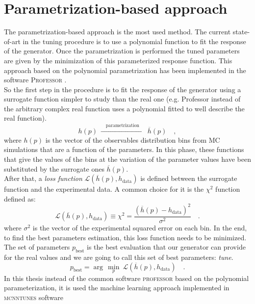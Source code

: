 \section{Parametrization-based approach}

The parametrization-based approach is the most used method. The current state-of-art in the tuning procedure is to use a polynomial function to fit the response of the generator. Once the parametrization is performed the tuned parameters are given by the minimization of this parameterized response function. This approach based on the polynomial parametrization has been  implemented in the software \textsc{Professor} \cite{Buckley:2009bj}. 
\\
So the first step in the procedure is to fit the response of the generator using a surrogate function simpler to study than the real one (e.g. Professor instead of the arbitrary complex real function uses a polynomial fitted to well describe the real function).
\begin{equation}
	h(p)\ \xrightarrow{\quad \text{parametrization}\quad }\ \overline{h}(p)\quad ,
\end{equation}
where $h(p)$ is the vector of the observables distribution bins from MC simulations that are a function of the parameters. In this phase, these functions that give the values of the bins at the variation of the parameter values have been substituted by the surrogate ones $\overline{h}(p)$.  
\\
After that, a \textit{loss function} $\mathcal{L}(\overline{h}(p),h_{\text{data}})$ is defined between the surrogate function and the experimental data. A common choice for it is the $\chi^2$ function defined as:
\begin{equation}
	\mathcal{L}(\overline{h}(p),h_{\text{data}})\equiv \chi^2=\frac{(\overline{h}(p)-h_{\text{data}})^2}{\sigma^2}\quad.
\end{equation}
where $\sigma^2$ is the vector of the experimental squared error on each bin.  
In the end, to find the best parameters estimation, this loss function needs to be minimized. The set of parameters $p_{\text{best}}$ is the best evaluation that our generator can provide for the real values and we are going to call this set of best parameters: \textit{tune}.
\begin{equation}
	p_{\text{best}}=\arg\,\min_p\ \mathcal{L}(\overline{h}(p),h_{\text{data}})\quad.
\end{equation}
In this thesis instead of the common software \textsc{professor} based on the polynomial parameterization, it is used the machine learning approach implemented in \textsc{mcnntunes} software \cite{MCNNTUNESonGitHub}
